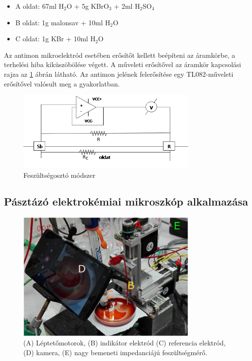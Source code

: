 \begin{itemize} \label{komponensek}
\item A oldat: 67ml H$_2$O + 5g KBrO$_3$ + 2ml H$_2$SO$_4$
\item B oldat: 1g malonsav + 10ml H$_2$O
\item C oldat: 1g KBr + 10ml H$_2$O
\end{itemize}

Az antimon mikroelektród esetében erősítőt kellett beépíteni az áramkörbe, a terhelési hiba kiküszöbölése végett. A műveleti erősítővel az áramkör kapcsolási rajza az \ref{fig:erosito} ábrán látható. Az antimon jelének felerősítése egy TL082-műveleti erősítővel valósult meg a gyakorlatban.
\begin{figure}[h!]
\centering
\includegraphics[width=0.8\textwidth]{img/erosito2.png}
\caption{Feszültségosztó módszer}
\label{fig:erosito}
\end{figure}


\subsection{Pásztázó elektrokémiai mikroszkóp alkalmazása}

\begin{figure}[h]
\centering
\includegraphics[width=0.8\textwidth]{img/secm.png}
\caption{(A) Léptetőmotorok, (B) indikátor elektród (C) referencia elektród, (D) kamera, (E) nagy bemeneti impedanciájú feszültségmérő.}
\label{fig:secm}
\end{figure}

